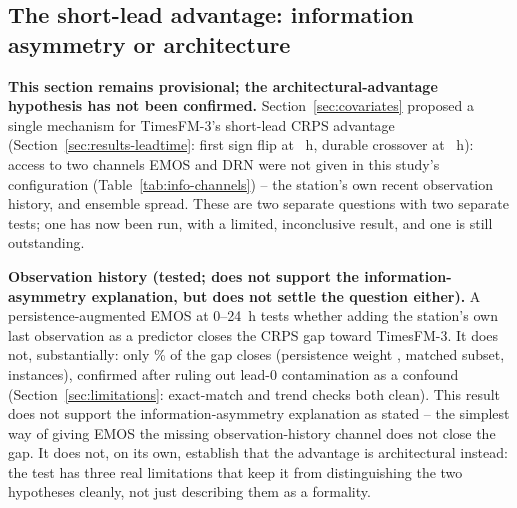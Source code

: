\subsection{The short-lead advantage: information asymmetry or architecture}
\label{sec:discussion-mechanism}

\textbf{This section remains provisional; the architectural-advantage
hypothesis has not been confirmed.} Section~\ref{sec:covariates}
proposed a single mechanism for TimesFM-3's short-lead CRPS advantage
(Section~\ref{sec:results-leadtime}: first sign flip at
\FirstSignFlipHours{}~h, durable crossover at
\DurableCrossoverHours{}~h): access to two channels EMOS and DRN were not
given in this study's configuration (Table~\ref{tab:info-channels}) --
the station's own recent observation history, and ensemble spread. These
are two separate questions with two separate tests; one has now been
run, with a limited, inconclusive result, and one is still outstanding.

\textbf{Observation history (tested; does not support the
information-asymmetry explanation, but does not settle the question
either).} A persistence-augmented EMOS at 0--24~h tests whether adding
the station's own last observation as a predictor closes the CRPS gap
toward TimesFM-3. It does not, substantially: only
\PersistenceGapClosedPct{}\% of the gap closes (persistence weight
\PersistenceWeight{}, matched subset, \NPersistenceMatchedInstances{}
instances), confirmed after ruling out lead-0 contamination as a
confound (Section~\ref{sec:limitations}: exact-match and trend checks
both clean). This result does not support the information-asymmetry
explanation as stated -- the simplest way of giving EMOS the missing
observation-history channel does not close the gap. It does not, on its
own, establish that the advantage is architectural instead: the test has
three real limitations that keep it from distinguishing the two
hypotheses cleanly, not just describing them as a formality.


